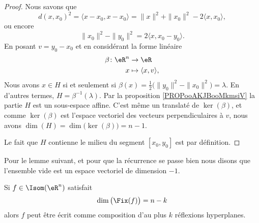 \begin{proof}
    Nous savons que
    \begin{equation}
        d(x,x_0)^2=\langle x-x_0, x-x_0\rangle =\| x \|^2+\| x_0 \|^2-2\langle x, x_0\rangle,
    \end{equation}
    ou encore
    \begin{equation}
        \| x_0 \|^2-\| y_0 \|^2=2\langle x, x_0-y_0\rangle .
    \end{equation}
    En posant \( v=y_0-x_0\) et en considérant la forme linéaire
    \begin{equation}
        \begin{aligned}
            \beta\colon \eR^n&\to \eR \\
            x&\mapsto \langle x, v\rangle , 
        \end{aligned}
    \end{equation}
    Nous avons \( x\in H\) si et seulement si \( \beta(x)=\frac{ 1 }{2}\big( \| y_0 \|^2-\| x_0 \|^2 \big)=\lambda\). En d'autres termes, \( H=\beta^{-1}(\lambda)\). Par la proposition \ref{PROPooAKJBooMkmsiV} la partie \( H\) est un sous-espace affine. C'est même un translaté de \( \ker(\beta)\), et comme \( \ker(\beta)\) est l'espace vectoriel des vecteurs perpendiculaires à \( v\), nous avons \( \dim(H)=\dim\big( \ker(\beta) \big)=n-1\).

    Le fait que \( H\) contienne le milieu du segment \( [x_0,y_0]\) est par définition.
\end{proof}

Pour le lemme suivant, et pour que la récurrence se passe bien nous disons que l'ensemble vide est un espace vectoriel de dimension \( -1\).
\begin{lemma}       \label{LEMooJCDRooGAmlwp}
    Si \( f\in\Isom(\eR^n)\) satisfait 
    \begin{equation}
        \dim\big( \Fix(f) \big)=n-k
    \end{equation}
    alors \( f\) peut être écrit comme composition d'au plus \( k\) réflexions hyperplanes.
\end{lemma}

